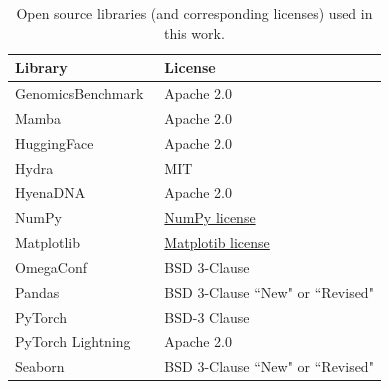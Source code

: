 \documentclass[pdflatex, sn-mathphys-num, lineno]{sn-jnl}%
\theoremstyle{thmstyleone}%
\theoremstyle{thmstyletwo}%
\theoremstyle{thmstylethree}%
\begin{document}
\begin{appendices}
	\begin{table}[h]
		\caption{Open source libraries (and corresponding licenses) used in this work.}
		\label{tab:assets}
		\vskip 0.15in
		\begin{center}
			\begin{small}
				\begin{tabular}{ll}
					\toprule
					Library                                                & License                                                                            \\ \midrule
					GenomicsBenchmark~\cite{grevsova2023genomic}           & Apache 2.0                                                                         \\
					Mamba~\cite{gu2023mamba}                               & Apache 2.0                                                                         \\
					HuggingFace~\cite{wolf2019huggingface}                 & Apache 2.0                                                                         \\
					Hydra~\cite{Yadan2019Hydra}                            & MIT                                                                                \\
					HyenaDNA~\cite{nguyen2024hyenadna}                     & Apache 2.0                                                                         \\
					NumPy~\cite{harris2020array}                           & \href{https://numpy.org/doc/stable/license.html}{NumPy license}                    \\
					Matplotlib~\cite{Hunter2007}                           & \href{https://matplotlib.org/stable/users/project/license.html}{Matplotib license} \\
					OmegaConf                                              & BSD 3-Clause                                                                       \\
					Pandas \cite{reback2020pandas}                         & BSD 3-Clause ``New" or ``Revised"                                                  \\
					PyTorch~\cite{paszke2019pytorch}                       & BSD-3 Clause                                                                       \\
					PyTorch Lightning~\cite{Falcon_PyTorch_Lightning_2019} & Apache 2.0                                                                         \\
					Seaborn~\cite{Waskom2021}                              & BSD 3-Clause ``New" or ``Revised"                                                  \\ \bottomrule
				\end{tabular}
			\end{small}
		\end{center}
	\end{table}


\end{appendices}
\end{document}
